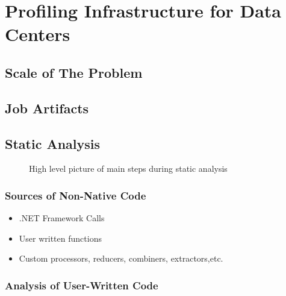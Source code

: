 \section{Profiling Infrastructure for Data Centers}

\subsection{Scale of The Problem}

\subsection{Job Artifacts}


\subsection{Static Analysis}

\begin{figure}[ht]


\caption{High level picture of main steps during static analysis}
\end{figure}


\subsubsection{Sources of Non-Native Code}

\begin{itemize}
\item .NET Framework Calls
\item User written functions
\item Custom processors, reducers, combiners, extractors,etc.
\end{itemize}

\subsubsection{Analysis of User-Written Code}